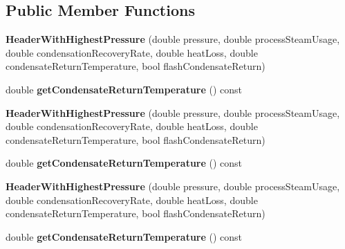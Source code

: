 \subsection*{Public Member Functions}
\begin{DoxyCompactItemize}
\item 
\mbox{\label{class_header_with_highest_pressure_a69ce8ca363835fdfe38624e66f4eff1f}} 
{\bfseries Header\+With\+Highest\+Pressure} (double pressure, double process\+Steam\+Usage, double condensation\+Recovery\+Rate, double heat\+Loss, double condensate\+Return\+Temperature, bool flash\+Condensate\+Return)
\item 
\mbox{\label{class_header_with_highest_pressure_a58cd8a058e65be1b3123569632ed0d7b}} 
double {\bfseries get\+Condensate\+Return\+Temperature} () const
\item 
\mbox{\label{class_header_with_highest_pressure_a69ce8ca363835fdfe38624e66f4eff1f}} 
{\bfseries Header\+With\+Highest\+Pressure} (double pressure, double process\+Steam\+Usage, double condensation\+Recovery\+Rate, double heat\+Loss, double condensate\+Return\+Temperature, bool flash\+Condensate\+Return)
\item 
\mbox{\label{class_header_with_highest_pressure_a58cd8a058e65be1b3123569632ed0d7b}} 
double {\bfseries get\+Condensate\+Return\+Temperature} () const
\item 
\mbox{\label{class_header_with_highest_pressure_a69ce8ca363835fdfe38624e66f4eff1f}} 
{\bfseries Header\+With\+Highest\+Pressure} (double pressure, double process\+Steam\+Usage, double condensation\+Recovery\+Rate, double heat\+Loss, double condensate\+Return\+Temperature, bool flash\+Condensate\+Return)
\item 
\mbox{\label{class_header_with_highest_pressure_a58cd8a058e65be1b3123569632ed0d7b}} 
double {\bfseries get\+Condensate\+Return\+Temperature} () const
\end{DoxyCompactItemize}
